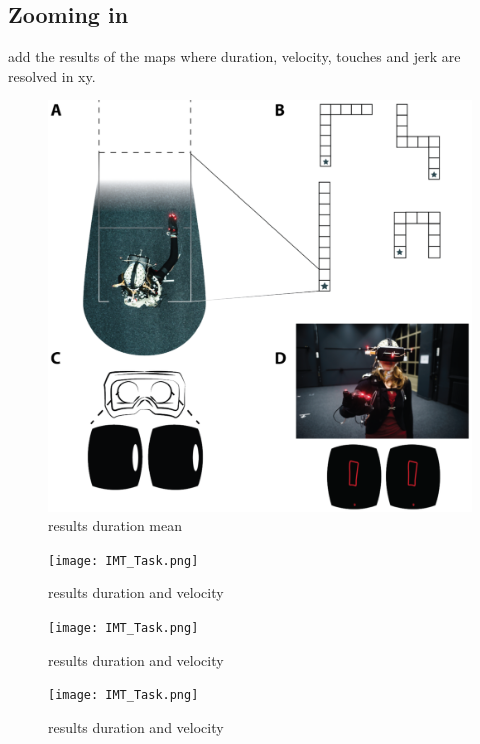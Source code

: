 \subsection{Zooming in} add the results of the maps where duration, velocity, touches and jerk are resolved in xy.

\begin{figure}[h]
\centering
\includegraphics[width=\linewidth]{figures/IMT_Task.png}
\vspace{0pt}
\caption{results duration mean}
\label{results_dur_mean}
\end{figure}

\begin{figure}[h]
\centering
\texttt{[image: IMT\_Task.png]}
\vspace{0pt}
\caption{results duration and velocity}
\label{results_dur_effect}
\end{figure}

\begin{figure}[h]
\centering
\texttt{[image: IMT\_Task.png]}
\vspace{0pt}
\caption{results duration and velocity}
\label{results_touches_mean}
\end{figure}

\begin{figure}[h]
\centering
\texttt{[image: IMT\_Task.png]}
\vspace{0pt}
\caption{results duration and velocity}
\label{results_touches_effect}
\end{figure}


